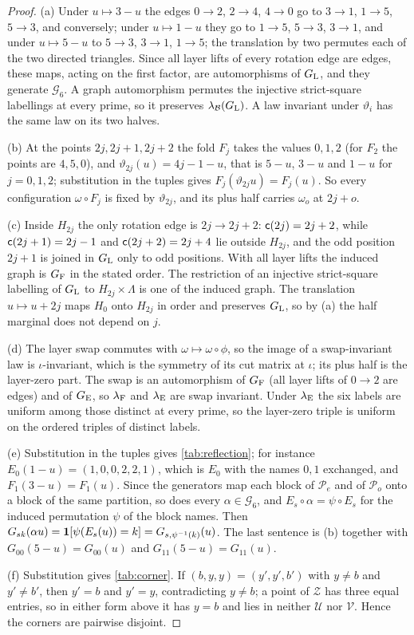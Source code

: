 \begin{proof}
(a) Under $u\mapsto3-u$ the edges $0\to2$, $2\to4$, $4\to0$ go to $3\to1$,
$1\to5$, $5\to3$, and conversely; under $u\mapsto1-u$ they go to $1\to5$,
$5\to3$, $3\to1$, and under $u\mapsto5-u$ to $5\to3$, $3\to1$, $1\to5$; the
translation by two permutes each of the two directed triangles. Since all layer
lifts of every rotation edge are edges, these maps, acting on the first
factor, are automorphisms of $G_{\rm L}$, and they generate $\mathcal G_6$. A
graph automorphism permutes the injective strict-square labellings at every
prime, so it preserves $\lambda_{\mathcal B}(G_{\rm L})$. A law invariant under
$\vartheta_i$ has the same law on its two halves.

(b) At the points $2j,2j+1,2j+2$ the fold $F_j$ takes the values $0,1,2$
(for $F_2$ the points are $4,5,0$), and $\vartheta_{2j}(u)=4j-1-u$, that is
$5-u$, $3-u$ and $1-u$ for $j=0,1,2$; substitution in the tuples gives
$F_j(\vartheta_{2j}u)=F_j(u)$. So every configuration $\omega\circ F_j$ is fixed
by $\vartheta_{2j}$, and its plus half carries $\omega_o$ at $2j+o$.

(c) Inside $H_{2j}$ the only rotation edge is $2j\to2j+2$: $\mathsf c(2j)=2j+2$,
while $\mathsf c(2j+1)=2j-1$ and $\mathsf c(2j+2)=2j+4$ lie outside $H_{2j}$, and the odd
position $2j+1$ is joined in $G_{\rm L}$ only to odd positions. With all layer lifts the induced
graph is $G_{\rm F}$ in the stated order. The restriction of an injective
strict-square labelling of $G_{\rm L}$ to $H_{2j}\times\Lambda$ is one of the
induced graph. The translation $u\mapsto u+2j$ maps $H_0$ onto $H_{2j}$ in order and
preserves $G_{\rm L}$, so by (a) the half marginal does not depend on $j$.

(d) The layer swap commutes with $\omega\mapsto\omega\circ\phi$, so the image of
a swap-invariant law is $\iota$-invariant, which is the symmetry of its cut
matrix at $\iota$; its plus half is the layer-zero part. The swap is an
automorphism of $G_{\rm F}$ (all layer lifts of $0\to2$ are edges) and of
$G_{\rm E}$, so $\lambda_{\rm F}$ and $\lambda_{\rm E}$ are swap invariant. Under
$\lambda_{\rm E}$ the six labels are uniform among those distinct at every
prime, so the layer-zero triple is uniform on the ordered triples of distinct
labels.

(e) Substitution in the tuples gives \cref{tab:reflection}; for instance
$E_0(1-u)=(1,0,0,2,2,1)$, which is $E_0$ with the names $0,1$ exchanged, and
$F_1(3-u)=F_1(u)$. Since the generators map each block of $\mathcal P_e$ and of
$\mathcal P_o$ onto a block of the same partition, so does every
$\alpha\in\mathcal G_6$, and $E_s\circ\alpha=\psi\circ E_s$ for the induced
permutation $\psi$ of the block names. Then
$G_{sk}(\alpha u)=\mathbf 1[\psi(E_s(u))=k]=G_{s,\psi^{-1}(k)}(u)$. The last
sentence is (b) together with $G_{00}(5-u)=G_{00}(u)$ and
$G_{11}(5-u)=G_{11}(u)$.

(f) Substitution gives \cref{tab:corner}. If $(b,y,y)=(y',y',b')$ with
$y\ne b$ and $y'\ne b'$, then $y'=b$ and $y'=y$, contradicting $y\ne b$; a
point of $\mathcal Z$ has three equal entries, so in either form above it
has $y=b$ and lies in neither $\mathcal U$ nor $\mathcal V$. Hence the
corners are pairwise disjoint.
\end{proof}

